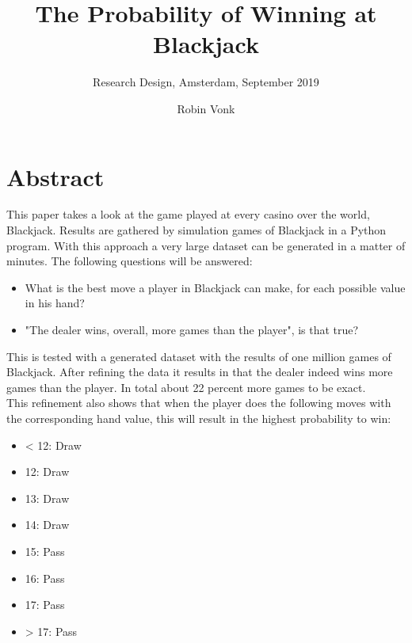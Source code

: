 \documentclass[acmtog,review]{acmart}
\begin{document}
\title{The Probability of Winning at Blackjack}
\subtitle{Research Design, Amsterdam, September 2019}

\author{Robin Vonk}

\maketitle

\section*{Abstract}
This paper takes a look at the game played at every casino over the world, Blackjack. Results are gathered by simulation games of Blackjack in a Python program. With this approach a very large dataset can be generated in a matter of minutes. The following questions will be answered: 
\begin{itemize}
  \item What is the best move a player in Blackjack can make, for each possible value in his hand?
  \item "The dealer wins, overall, more games than the player", is that true?
\end{itemize}
This is tested with a generated dataset with the results of one million games of Blackjack. After refining the data it results in that the dealer indeed wins more games than the player. In total about 22 percent more games to be exact. \\
This refinement also shows that when the player does the following moves with the corresponding hand value, this will result in the highest probability to win:
\begin{itemize}
    \item < 12: Draw
    \item 12: Draw
    \item 13: Draw
    \item 14: Draw
    \item 15: Pass
    \item 16: Pass
    \item 17: Pass
    \item > 17: Pass
\end{itemize}










% 

% 
\end{document}
